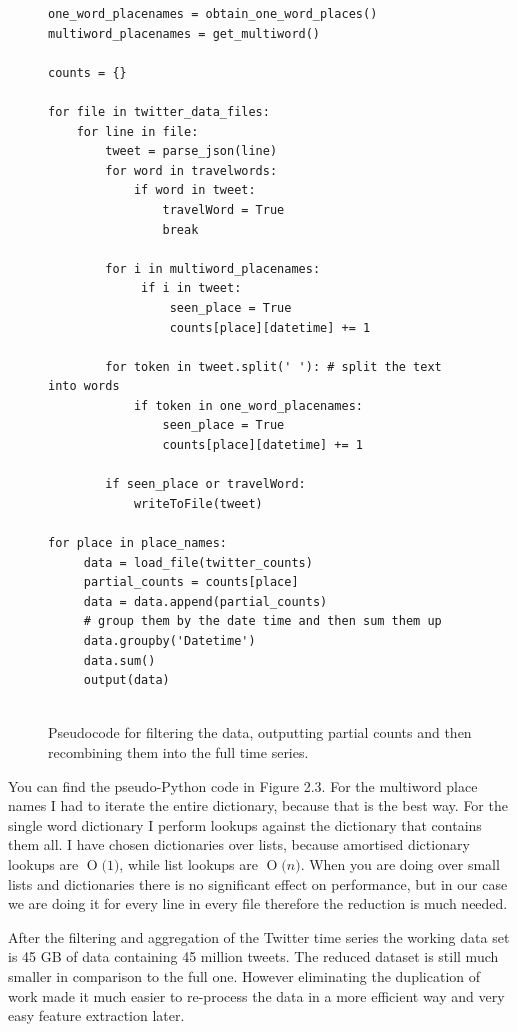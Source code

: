 \documentclass[minf,twoside,singlespacing,parskip,frontabs,notimes,11pt]{infthesis}
\newcommand{\BigO}[1]{\ensuremath{\operatorname{O}\bigl(#1\bigr)}}
\begin{document}
\begin{figure}[]
\begin{center}
\begin{lstlisting}
one_word_placenames = obtain_one_word_places()
multiword_placenames = get_multiword()

counts = {}

for file in twitter_data_files:
    for line in file:
        tweet = parse_json(line)
        for word in travelwords: 
            if word in tweet:
                travelWord = True
                break
                            
        for i in multiword_placenames:
             if i in tweet:
                 seen_place = True
                 counts[place][datetime] += 1
                            
        for token in tweet.split(' '): # split the text into words
            if token in one_word_placenames:
                seen_place = True
                counts[place][datetime] += 1

        if seen_place or travelWord:
            writeToFile(tweet)

for place in place_names:
     data = load_file(twitter_counts)
     partial_counts = counts[place]
     data = data.append(partial_counts)
     # group them by the date time and then sum them up
     data.groupby('Datetime')
     data.sum()
     output(data)
    
\end{lstlisting}
\end{center}
\caption{Pseudocode for filtering the data, outputting partial counts and then recombining them into the full time series. }
\end{figure}

You can find the pseudo-Python code in Figure 2.3. For the multiword place names I had to iterate the entire dictionary, because that is the best way. For the single word dictionary I perform lookups against the dictionary that contains them all. I have chosen dictionaries over lists, because amortised dictionary lookups are  \BigO{1}, while list lookups are  \BigO{n}. When you are doing over small lists and dictionaries there is no significant effect on performance, but in our case we are doing it for every line in every file therefore the reduction is much needed.


After the filtering and aggregation of the Twitter time series the working data set is 45 GB of data containing 45 million tweets. The reduced dataset is still much smaller in comparison to the full one. However eliminating the duplication of work made it much easier to re-process the data in a more efficient way and very easy feature extraction later. 
\end{document}
